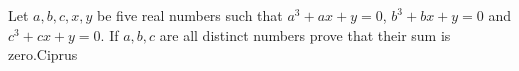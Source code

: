 Let $ a,b,c,x,y$ be five real numbers such that $ a^3 + ax + y = 0$, $ b^3 + bx + y = 0$ and $ c^3 + cx + y = 0$. If $ a,b,c$ are all distinct numbers prove that their sum is zero.Ciprus
